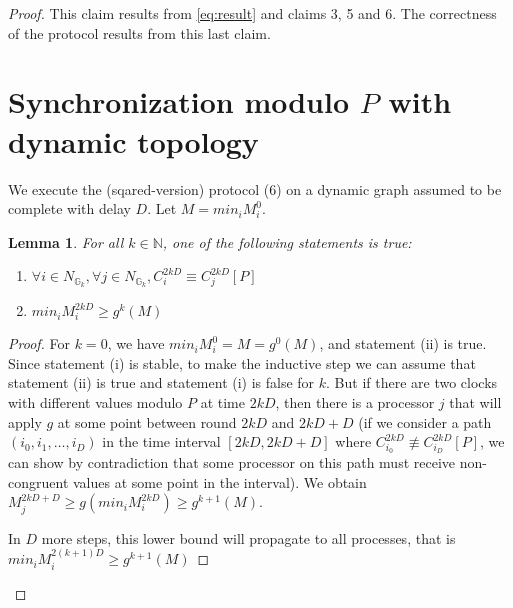 \documentclass[11pt,letterpaper]{article}
\newtheorem{lem}[thm]{Lemma}
\begin{document}
\begin{proof}
	This claim results from \eqref{eq:result} and claims 3, 5 and 6.
	The correctness of the protocol results from this last claim.


\section{Synchronization modulo $P$ with dynamic topology}

	We execute the (sqared-version) protocol (6) on a dynamic graph
	assumed to be complete with delay $D$. Let $M = min_i M_i^0$.

\begin{lem} \label{lem:croissant2}
	For all $k \in \mathds{N}$, one of the following statements is true:
	\begin{enumerate}
		\item $\forall i \in N_{\mathds{G}_k}, \forall j \in N_{\mathds{G}_k}, C_i^{2kD} \equiv C_j^{2kD} [P]$
		\item $min_i M_i^{2kD} \geq g^k(M)$
	\end{enumerate}
\end{lem}
\begin{proof}
	For $k=0$, we have $min_i M_i^0 = M = g^0(M)$, and
	statement (ii) is true. Since statement (i) is stable, to make
	the inductive step we can assume that statement (ii) is true
	and statement (i) is false for $k$.
	But if there are two clocks
	with different values modulo $P$ at time $2kD$, then 
	there is a processor $j$ that
	will apply $g$ at some point between round $2kD$ and $2kD+D$
	(if we consider a path $(i_0, i_1, \dots, i_D)$ in the time interval $[2kD, 2kD+D]$ where $C_{i_0}^{2kD} \not\equiv C_{i_D}^{2kD} [P]$,
	we can show by contradiction that some processor on this path must receive non-congruent values
	at some point in the interval).
	We obtain
	$M_j^{2kD+D} \geq g(min_i M_i^{2kD}) \geq g^{k+1}(M)$.

	In $D$ more steps, this lower bound will propagate to all processes, that is
	$min_i M_i^{2(k+1)D} \geq g^{k+1}(M)$
\end{proof}


\end{proof}
\end{document}
